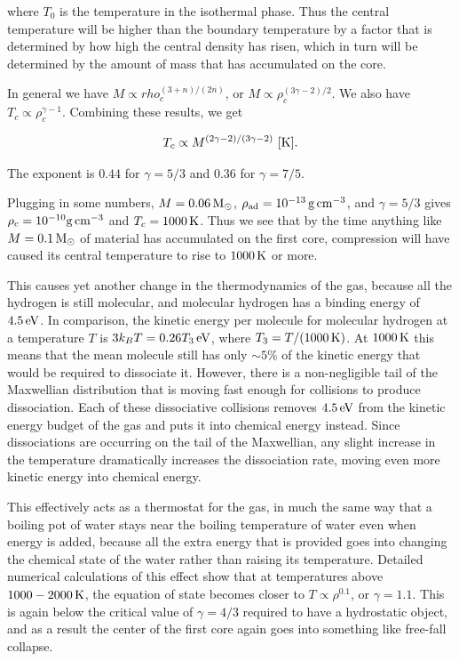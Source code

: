 \documentclass[a4paper,10pt]{article}
\begin{document}
{\noindent}where $T_0$ is the temperature in the isothermal phase. Thus the central temperature will be higher than the boundary temperature by a factor that is determined by how high the central density has risen, which in turn will be determined by the amount of mass that has accumulated on the core.

{\noindent}In general we have $M\propto
rho_c^{(3+n)/(2n)}$, or $M\propto\rho_c^{(3\gamma-2)/2}$. We also have $T_c\propto\rho_c^{\gamma-1}$. Combining these results, we get

\begin{align*}
    T_c \propto M^{(2\gamma-2)/(3\gamma-2)} ~ [{\rm K}].
\end{align*}

{\noindent}The exponent is $0.44$ for $\gamma=5/3$ and $0.36$ for $\gamma=7/5$.

{\noindent}Plugging in some numbers, $M=0.06\,{\rm M_\odot}$, $\rho_{\rm ad}=10^{-13}\,{\rm g\,cm^{-3}}$, and $\gamma=5/3$ gives $\rho_c=10^{-10}{\rm g\,cm^{-3}}$ and $T_c=1000\,{\rm K}$. Thus we see that by the time anything like $M=0.1\,{\rm M_\odot}$ of material has accumulated on the first core, compression will have caused its central temperature to rise to $1000\,{\rm K}$ or more.

{\noindent}This causes yet another change in the thermodynamics of the gas, because all the hydrogen is still molecular, and molecular hydrogen has a binding energy of $4.5\,{\rm eV}$. In comparison, the kinetic energy per molecule for molecular hydrogen at a temperature $T$ is $3k_BT=0.26T_3\,{\rm eV}$, where $T_3=T/(1000\,{\rm K})$. At $1000\,{\rm K}$ this means that the mean molecule still has only $\sim5\%$ of the kinetic energy that would be required to dissociate it. However, there is a non-negligible tail of the Maxwellian distribution that is moving fast enough for collisions to produce dissociation. Each of these dissociative collisions removes $4.5\,{\rm eV}$ from the kinetic energy budget of the gas and puts it into chemical energy instead. Since dissociations are occurring on the tail of the Maxwellian, any slight increase in the temperature dramatically increases the dissociation rate, moving even more kinetic energy into chemical energy.

{\noindent}This effectively acts as a thermostat for the gas, in much the same way that a boiling pot of water stays near the boiling temperature of water even when energy is added, because all the extra energy that is provided goes into changing the chemical state of the water rather than raising its temperature. Detailed numerical calculations of this effect show that at temperatures above $1000-2000\,{\rm K}$, the equation of state becomes closer to $T\propto\rho^{0.1}$, or $\gamma=1.1$. This is again below the critical value of $\gamma=4/3$ required to have a hydrostatic object, and as a result the center of the first core again goes into something like free-fall collapse.
\end{document}
